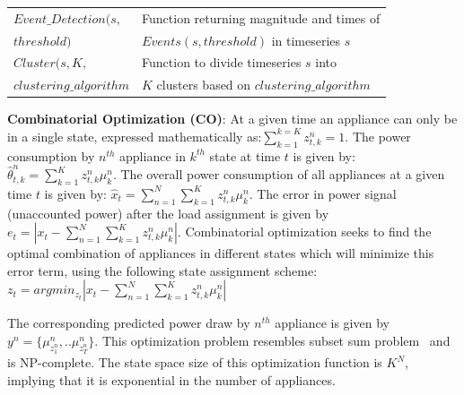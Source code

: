 \documentclass[conference]{IEEEtran}
\begin{document}
\begin{table}[ht!]
\begin{tabular}{|l|l|}
\hline
$Event\_Detection(s,$ & Function returning magnitude and times of \\
$threshold)$                  &$Events(s,threshold)$ in timeseries $s$\\
\hline
$Cluster(s,K,$& Function to divide timeseries $s$ into\\
$clustering\_algorithm$&$K$ clusters based on $clustering\_algorithm$ \\
\hline

                             
                                                                               

\hline
%
\end{tabular}
\vspace{-8pt}
\end{table}

\noindent \textbf{Combinatorial Optimization (CO)}: At a given time an appliance can only be in a single state, expressed mathematically as:$\sum\limits_{k=1}^{k=K} z_{t,k}^n=1$. The power consumption by $n^{th}$ appliance in $k^{th}$ state at time $t$ is given by: $\hat{\theta}^n_{t,k}=\sum\limits_{k=1}^{K} z_{t,k}^n \mu_k^n$. The overall power consumption of all appliances at a given time $t$ is given by: $\hat{x}_{t}=\sum\limits_{n=1}^{N}\sum\limits_{k=1}^{K} z_{t,k}^n \mu_k^n$. The error in power signal (unaccounted power) after the load assignment is given by $e_t=|x_t-\sum\limits_{n=1}^{N}\sum\limits_{k=1}^{K}z_{t,k}^n\mu_k^n|$. Combinatorial optimization seeks to find the optimal combination of appliances in different states which will minimize this error term, using the following state assignment scheme:
\vspace{-1mm}
$z_t=arg min_{z_t}|x_t-\sum\limits_{n=1}^{N}\sum\limits_{k=1}^{K}z_{t,k}^n\mu_k^n|$
\vspace{-1mm}

\noindent The corresponding predicted power draw by $n^{th}$ appliance is given by $y^n=\{\mu_{z_1^n}^n,..\mu_{z_T^n}^n \}$. This optimization problem resembles subset sum problem~\cite{knapsack} and is NP-complete. The state space size of this optimization function is $K^N$, implying that it is exponential in the number of appliances. 
\end{document}
